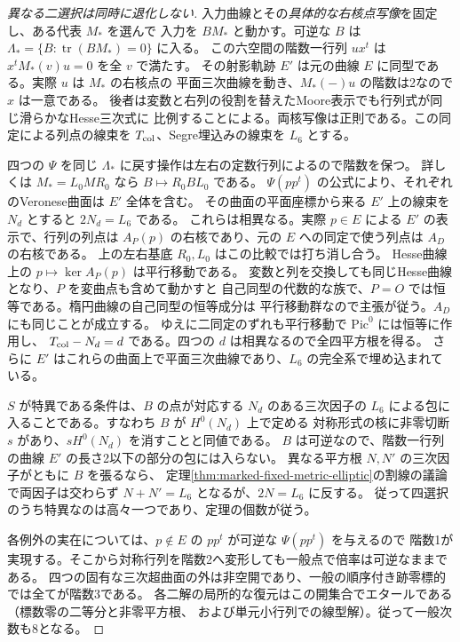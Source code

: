 \begin{proof}[異なる二選択は同時に退化しない]
入力曲線とその\emph{具体的な右核点写像}を固定し、ある代表 $M_*$ を選んで
入力を $B M_*$ と動かす。可逆な $B$ は $\Lambda_*=\{B:\operatorname{tr}(BM_*)=0\}$ に入る。
この六空間の階数一行列 $u x^t$ は $x^t M_*(v)u=0$ を全 $v$ で満たす。
その射影軌跡 $E'$ は元の曲線 $E$ に同型である。実際 $u$ は $M_*$ の右核点の
平面三次曲線を動き、$M_*(-)u$ の階数は2なので $x$ は一意である。
後者は変数と右列の役割を替えたMoore表示でも行列式が同じ滑らかなHesse三次式に
比例することによる。両核写像は正則である。この同定による列点の線束を
$T_{\rm col}$、Segre埋込みの線束を $L_6$ とする。

四つの $\Psi$ を同じ $\Lambda_*$ に戻す操作は左右の定数行列によるので階数を保つ。
詳しくは $M_*=L_0 M R_0$ なら $B\mapsto R_0 B L_0$ である。
$\Psi(pp^t)$ の公式により、それぞれのVeronese曲面は $E'$ 全体を含む。
その曲面の平面座標から来る $E'$ 上の線束を $N_d$ とすると $2N_d=L_6$ である。
これらは相異なる。実際 $p\in E$ による $E'$ の表示で、行列の列点は
$A_P(p)$ の右核であり、元の $E$ への同定で使う列点は $A_D$ の右核である。
上の左右基底 $R_0,L_0$ はこの比較では打ち消し合う。
Hesse曲線上の $p\mapsto\ker A_P(p)$ は平行移動である。
変数と列を交換しても同じHesse曲線となり、$P$ を変曲点も含めて動かすと
自己同型の代数的な族で、$P=O$ では恒等である。楕円曲線の自己同型の恒等成分は
平行移動群なので主張が従う。$A_D$ にも同じことが成立する。
ゆえに二同定のずれも平行移動で $\mathrm{Pic}^0$ には恒等に作用し、
$T_{\rm col}-N_d=d$ である。四つの $d$ は相異なるので全四平方根を得る。
さらに $E'$ はこれらの曲面上で平面三次曲線であり、$L_6$ の完全系で埋め込まれている。

$S$ が特異である条件は、$B$ の点が対応する $N_d$ のある三次因子の
$L_6$ による包に入ることである。すなわち $B$ が $H^0(N_d)$ 上で定める
対称形式の核に非零切断 $s$ があり、$sH^0(N_d)$ を消すことと同値である。
$B$ は可逆なので、階数一行列の曲線 $E'$ の長さ2以下の部分の包には入らない。
異なる平方根 $N,N'$ の三次因子がともに $B$ を張るなら、
定理\ref{thm:marked-fixed-metric-elliptic}の割線の議論で両因子は交わらず
$N+N'=L_6$ となるが、$2N=L_6$ に反する。
従って四選択のうち特異なのは高々一つであり、定理の個数が従う。

各例外の実在については、$p\notin E$ の $pp^t$ が可逆な $\Psi(pp^t)$ を与えるので
階数1が実現する。そこから対称行列を階数2へ変形しても一般点で倍率は可逆なままである。
四つの固有な三次超曲面の外は非空開であり、一般の順序付き跡零標的では全てが階数3である。
各二解の局所的な復元はこの開集合でエタールである（標数零の二等分と非零平方根、
および単元小行列での線型解）。従って一般次数も8となる。
\end{proof}
